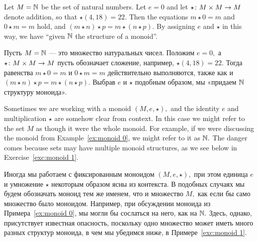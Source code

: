 \documentclass[../main/CT4S-EN-RU]{subfiles}
\begin{document}
\begin{exampleENG}\label{ex:monoid 0}
Let $M={\mathbb N}$ be the set of natural numbers. Let $e=0$ and let $\star\colon M\times M\rightarrow M$ denote addition, so that $\star(4,18)=22.$ Then the equations $m\star 0=m$ and $0\star m=m$ hold, and $(m\star n)\star p=m\star (n\star p).$ By assigning $e$ and $\star$ in this way, we have “given ${\mathbb N}$ the structure of a monoid”.
\end{exampleENG}

\begin{exampleRUS}\label{ex:monoid 0}
Пусть $M={\mathbb N}$ — это множество натуральных чисел. Положим $e=0,$ а $\star\colon M\times M\rightarrow M$ пусть обозначает сложение, например, $\star(4,18)=22.$ Тогда равенства $m\star 0=m$ и $0\star m=m$ действительно выполняются, также как и $(m\star n)\star p=m\star (n\star p).$ Выбрав $e$ и $\star$ подобным образом, мы «придаем ${\mathbb N}$ структуру моноида».
\end{exampleRUS}

\begin{remarkENG}
Sometimes we are working with a monoid $(M,e,\star),$ and the identity $e$ and multiplication $\star$ are somehow clear from context. In this case we might refer to the set $M$ as though it were the whole monoid. For example, if we were discussing the monoid from Example~\ref{ex:monoid 0}, we might refer to it as ${\mathbb N}.$ The danger comes because sets may have multiple monoid structures, as we see below in Exercise~\ref{exc:monoid 1}.
\end{remarkENG}

\begin{remarkRUS}
Иногда мы работаем с фиксированным моноидом $(M,e,\star),$ при этом единица $e$ и умножение $\star$ некоторым образом ясны из контекста. В подобных случаях мы будем обозначать моноид тем же именем, что и множество $M,$ как если бы само множество было моноидом. Например, при обсуждении моноида из Примера~\ref{ex:monoid 0}, мы могли бы сослаться на него, как на ${\mathbb N}.$ Здесь, однако, присутствует известная опасность, поскольку одно множество может иметь много разных структур моноида, в чем мы убедимся ниже, в Примере~\ref{exc:monoid 1}.
\end{remarkRUS}
\end{document}
